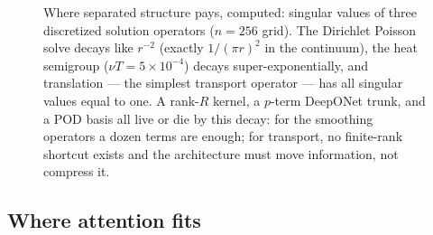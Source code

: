 \documentclass[10pt,a4paper]{article}
\begin{document}
\begin{figure}[t]
\centering
{}
\caption{Where separated structure pays, computed: singular values of
three discretized solution operators ($n = 256$ grid). The Dirichlet
Poisson solve decays like $r^{-2}$ (exactly $1/(\pi r)^2$ in the
continuum), the heat semigroup ($\nu T = 5\times 10^{-4}$) decays
super-exponentially, and translation --- the simplest transport operator
--- has all singular values equal to one. A rank-$R$ kernel, a
$p$-term DeepONet trunk, and a POD basis all live or die by this decay:
for the smoothing operators a dozen terms are enough; for transport, no
finite-rank shortcut exists and the architecture must move information,
not compress it.}
\label{fig:svd}
\end{figure}

\subsection{Where attention fits}
\end{document}
